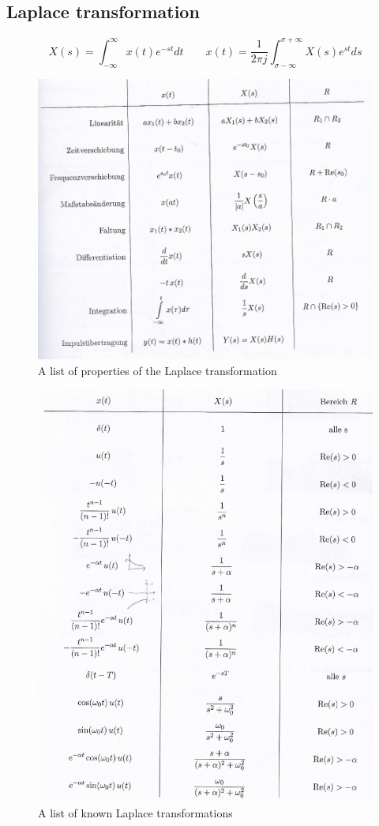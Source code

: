 \documentclass[10pt,a4paper]{article}
\begin{document}
\subsection{Laplace transformation}
$$
X(s) = \int_{-\infty}^{\infty} x(t)e^{-st}dt \qquad
x(t) = \frac{1}{2\pi j} \int_{\sigma-\infty}^{\sigma+\infty} X(s)e^{st}ds
$$
\begin{figure}[H]
\centering
\includegraphics[scale=0.8]{3LaplaceProperties.PNG}
\caption{A list of properties of the Laplace transformation}
\label{FourierContProperties}
\end{figure}
\begin{figure}[H]
\centering
\includegraphics[scale=0.9]{3LaplaceIdentities.PNG}
\caption{A list of known Laplace transformations}
\end{figure}
\end{document}
